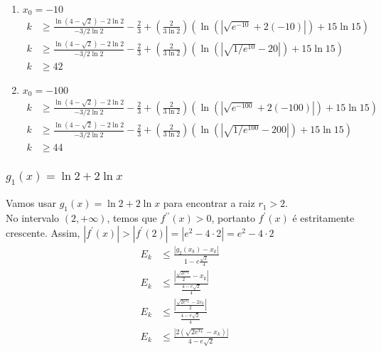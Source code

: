 \documentclass{article}
\begin{document}
\begin{enumerate}
\begin{enumerate}
            \item $x_0 = -10$
            \begin{align*}
                k &\geq \frac{\ln(4 - \sqrt{2}) - 2\ln 2}{-3/2 \ln 2} - \frac{2}{3} +
                \left(\frac{2}{3\ln 2}\right)(\ln(|\sqrt{e^{-10}} + 2(-10)|) + 15 \ln 15)\\
                k &\geq \frac{\ln(4 - \sqrt{2}) - 2\ln 2}{-3/2 \ln 2} - \frac{2}{3} +
                \left(\frac{2}{3\ln 2}\right)(\ln(|\sqrt{1/e^{10}} - 20|) + 15 \ln 15)\\
                k & \geq 42
            \end{align*}
            \item $x_0 = -100$
            \begin{align*}
                k &\geq \frac{\ln(4 - \sqrt{2}) - 2\ln 2}{-3/2 \ln 2} - \frac{2}{3} +
                \left(\frac{2}{3\ln 2}\right)(\ln(|\sqrt{e^{-100}} + 2(-100)|) + 15 \ln 15)\\
                k &\geq \frac{\ln(4 - \sqrt{2}) - 2\ln 2}{-3/2 \ln 2} - \frac{2}{3} +
                \left(\frac{2}{3\ln 2}\right)(\ln(|\sqrt{1/e^{100}} - 200|) + 15 \ln 15)\\
                k & \geq 44
            \end{align*}
        \end{enumerate}
    \end{enumerate}

    \subsubsection[g1]{$g_1(x) = \ln 2 + 2 \ln x$}
    Vamos usar $g_1(x) = \ln 2 + 2 \ln x$ para encontrar a raiz $r_1 > 2$.\\
    No intervalo $(2, +\infty)$, temos que $f^{\prime \prime}(x) > 0$, portanto $f^\prime(x)$ é estritamente crescente. Assim, $|f^\prime(x)| > |f^\prime(2)| = |e^2 - 4\cdot2| = e^2 - 4\cdot2$
    \begin{align*}
       E_{k} &\leq \frac{|g_2(x_k) - x_k|}{1 - e \frac{\sqrt{2}}{4}}\\
       E_{k} &\leq \frac{|\frac{\sqrt{2e^{x_k}}}{2} - x_k|}{\frac{4 - e\sqrt{2}}{4}}\\
       E_{k} &\leq \frac{|\frac{\sqrt{2e^{x_k}} - 2x_k}{2}|}{\frac{4 - e\sqrt{2}}{4}}\\
       E_{k} &\leq \frac{|2(\sqrt{2e^{x_k}} - x_k)|}{4 - e\sqrt{2}}\\
    \end{align*}
\end{document}
